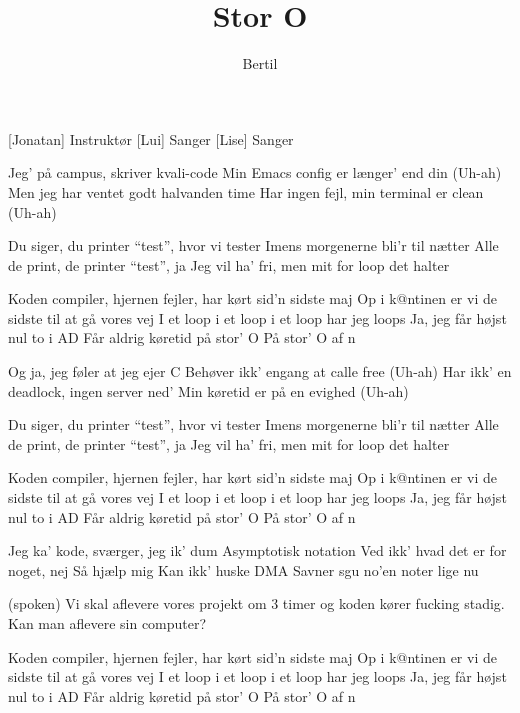 \documentclass[a4paper,11pt]{article}
\title{Stor O}
\author{Bertil}
\begin{document}
\maketitle

\begin{roles}
[Jonatan] Instruktør
[Lui] Sanger
[Lise] Sanger
\end{roles}

\begin{props}
\prop{}
\end{props}

\begin{song}
Jeg’ på campus, skriver kvali-code
Min Emacs config er længer’ end din (Uh-ah)
Men jeg har ventet godt halvanden time
Har ingen fejl, min terminal er clean (Uh-ah)


Du siger, du printer “test”, hvor vi tester
Imens morgenerne bli’r til nætter
Alle de print, de printer “test”, ja
Jeg vil ha’ fri, men mit for loop det halter


Koden compiler, hjernen fejler, har kørt sid’n sidste maj
Op i k@ntinen er vi de sidste til at gå vores vej
I et loop i et loop i et loop har jeg loops
Ja, jeg får højst nul to i AD
Får aldrig køretid på stor' O
På stor’ O af n


Og ja, jeg føler at jeg ejer C
Behøver ikk' engang at calle free (Uh-ah) 
Har ikk’ en deadlock, ingen server ned’
Min køretid er på en evighed (Uh-ah)

 
Du siger, du printer “test”, hvor vi tester
Imens morgenerne bli’r til nætter
Alle de print, de printer “test”, ja
Jeg vil ha’ fri, men mit for loop det halter

 
Koden compiler, hjernen fejler, har kørt sid’n sidste maj
Op i k@ntinen er vi de sidste til at gå vores vej
I et loop i et loop i et loop har jeg loops
Ja, jeg får højst nul to i AD
Får aldrig køretid på stor' O
På stor’ O af n


Jeg ka’ kode, sværger, jeg ik’ dum
Asymptotisk notation
Ved ikk' hvad det er for noget, nej
Så hjælp mig
Kan ikk' huske DMA
Savner sgu no'en noter lige nu



(spoken) Vi skal aflevere vores projekt om 3 timer og koden kører fucking stadig. Kan man aflevere sin computer?


Koden compiler, hjernen fejler, har kørt sid’n sidste maj
Op i k@ntinen er vi de sidste til at gå vores vej
I et loop i et loop i et loop har jeg loops
Ja, jeg får højst nul to i AD
Får aldrig køretid på stor' O
På stor’ O af n

    

\end{song}
\end{document}
